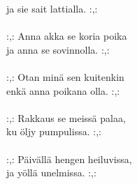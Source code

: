             ja sie sait lattialla. :,: \\
\hspace{10mm} \\
            :,: Anna akka se koria poika \\
            ja anna se sovinnolla. :,: \\
\hspace{10mm} \\
            :,: Otan minä sen kuitenkin \\
            enkä anna poikana olla. :,: \\
\hspace{10mm} \\
            :,: Rakkaus se meissä palaa, \\
            ku öljy pumpulissa. :,: \\
\hspace{10mm} \\
            :,: Päivällä hengen heiluvissa, \\
            ja yöllä unelmissa. :,: \\
